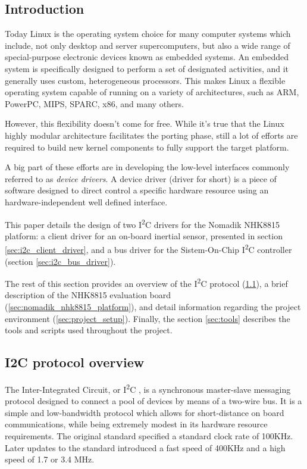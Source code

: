\documentclass[a4paper,10pt]{article}
\newcommand{\icc}{I\textsuperscript{2}C }
\begin{document}
\vspace{4ex}	%
\begin{multicols}{2}

\section{Introduction}
Today Linux is the operating system choice for many computer systems which
include, not only desktop and server supercomputers, but also a wide range of 
special-purpose electronic devices known as embedded systems.
An embedded system is specifically designed to perform a set of designated
activities, and it generally uses custom, heterogeneous processors. This makes
Linux a flexible operating system capable of running on a variety of
architectures, such as ARM, PowerPC, MIPS, SPARC, x86, and many others.

However, this flexibility doesn't come for free. While it's true that the
Linux highly modular architecture facilitates the porting phase, still a
lot of efforts are required to build new kernel components to fully
support the target platform.

A big part of these efforts are in developing the low-level interfaces
commonly referred to as \emph{device drivers}.
A device driver (driver for short) is a piece of software designed to direct
control a specific hardware resource using an hardware-independent well defined
interface.

This paper details the design of two \icc drivers for the Nomadik NHK8815
platform: a client driver for an on-board inertial sensor, presented in
section \ref{sec:i2c_client_driver}, and a bus driver for the Sistem-On-Chip
\icc controller (section \ref{sec:i2c_bus_driver}).

The rest of this section provides an overview of the \icc protocol
(\ref{sec:i2c_protocol_overview}), a brief description of the NHK8815 evaluation
board (\ref{sec:nomadik_nhk8815_platform}), and detail information regarding
the project environment (\ref{sec:project_setup}). Finally, the section
\ref{sec:tools} describes the tools and scripts used throughout the project.



\subsection{I2C protocol overview}
\label{sec:i2c_protocol_overview}
The Inter-Integrated Circuit, or \icc, is a synchronous master-slave messaging
protocol designed to connect a pool of devices by means of a two-wire bus.
It is a simple and low-bandwidth protocol which allows for short-distance on
board communications, while being extremely modest in its hardware resource
requirements. The original standard specified a standard clock rate of 100KHz.
Later updates to the standard introduced a fast speed of 400KHz and a high speed
of 1.7 or 3.4 MHz.


\end{multicols}
\end{document}
